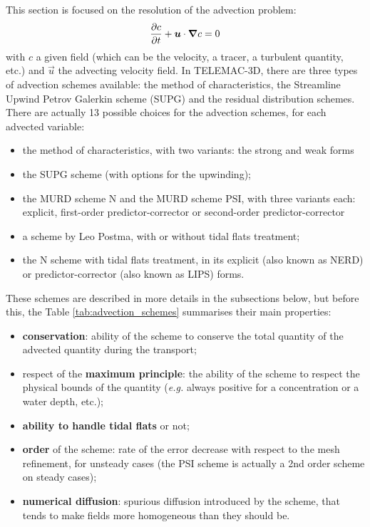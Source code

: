 This section is focused on the resolution of the advection problem:
\begin{equation}\label{eq:advection_equation}
\dfrac{\partial c}{\partial t} + \bm{u}\cdot\bm{\nabla} c = 0
\end{equation}
with $c$ a given field (which can be the velocity, a tracer, a turbulent quantity, etc.)
and $\vec{u}$ the advecting velocity field.
In TELEMAC-3D, there are three types of advection schemes available: the method of characteristics, the Streamline Upwind Petrov Galerkin scheme (SUPG) and the
residual distribution schemes. There are actually 13 possible choices for the advection schemes, for each advected variable:
\begin{itemize}
\item the method of characteristics, with two variants: the strong and weak forms
\item the SUPG scheme (with options for the upwinding);
\item the MURD scheme N and the MURD scheme PSI, with three variants each: explicit, first-order predictor-corrector or second-order predictor-corrector
\item a scheme by Leo Postma, with or without tidal flats treatment;
\item the N scheme with tidal flats treatment, in its explicit (also known as NERD) or predictor-corrector (also known as LIPS) forms.
\end{itemize}
These schemes are described in more details in the subsections below, but before this, the Table
\ref{tab:advection_schemes} summarises their main properties:
\begin{itemize}
\item \textbf{conservation}: ability of the scheme to conserve the total quantity of the advected quantity during the transport;
\item respect of the \textbf{maximum principle}: the ability of the scheme to respect the
physical bounds of the quantity (\textit{e.g.} always positive for a concentration or a water depth, etc.);
\item \textbf{ability to handle tidal flats} or not;
\item \textbf{order} of the scheme: rate of the error decrease with respect to the mesh refinement, for unsteady cases (the PSI scheme is actually a 2nd order scheme on steady cases);
\item \textbf{numerical diffusion}: spurious diffusion introduced by the scheme, that tends to make fields more homogeneous than they should be.
\end{itemize}
